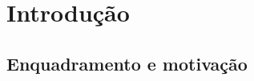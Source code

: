 \newcommand{\novathesis}{\emph{novathesis}}
\newcommand{\novathesisclass}{\texttt{novathesis.cls}}

\chapter{Introdução}
\label{cap1}
\section{Enquadramento e motivação}
\label{motif}

